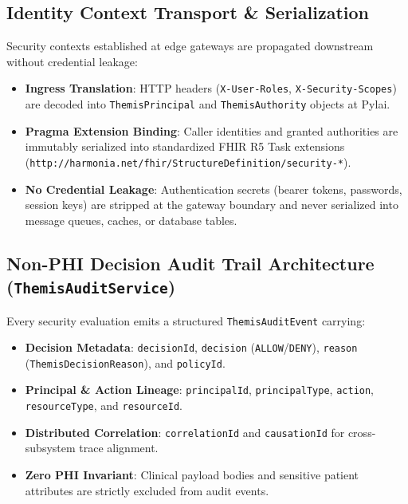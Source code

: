 \subsection{Identity Context Transport \& Serialization}
Security contexts established at edge gateways are propagated downstream without credential leakage:
\begin{itemize}
    \item \textbf{Ingress Translation}: HTTP headers (\texttt{X-User-Roles}, \texttt{X-Security-Scopes}) are decoded into \texttt{ThemisPrincipal} and \texttt{ThemisAuthority} objects at Pylai.
    \item \textbf{Pragma Extension Binding}: Caller identities and granted authorities are immutably serialized into standardized FHIR R5 Task extensions (\texttt{http://harmonia.net/fhir/StructureDefinition/security-*}).
    \item \textbf{No Credential Leakage}: Authentication secrets (bearer tokens, passwords, session keys) are stripped at the gateway boundary and never serialized into message queues, caches, or database tables.
\end{itemize}

\subsection{Non-PHI Decision Audit Trail Architecture (\texttt{ThemisAuditService})}
Every security evaluation emits a structured \texttt{ThemisAuditEvent} carrying:
\begin{itemize}
    \item \textbf{Decision Metadata}: \texttt{decisionId}, \texttt{decision} (\texttt{ALLOW}/\texttt{DENY}), \texttt{reason} (\texttt{ThemisDecisionReason}), and \texttt{policyId}.
    \item \textbf{Principal \& Action Lineage}: \texttt{principalId}, \texttt{principalType}, \texttt{action}, \texttt{resourceType}, and \texttt{resourceId}.
    \item \textbf{Distributed Correlation}: \texttt{correlationId} and \texttt{causationId} for cross-subsystem trace alignment.
    \item \textbf{Zero PHI Invariant}: Clinical payload bodies and sensitive patient attributes are strictly excluded from audit events.
\end{itemize}

